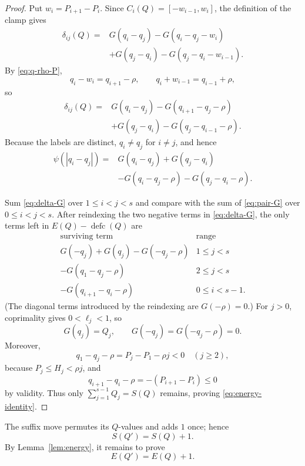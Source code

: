 \documentclass[10pt]{article}
\newcommand{\defc}{\operatorname{defc}}
\begin{document}
\begin{proof}
Put \(w_i=P_{i+1}-P_i\).  Since
\(C_i(Q)=[-w_{i-1},w_i]\), the definition of the clamp gives
\[
\begin{aligned}
\delta_{ij}(Q)
={}&G(q_i-q_j)-G(q_i-q_j-w_i)\\
 &+G(q_j-q_i)-G(q_j-q_i-w_{i-1}).
\end{aligned}
\]
By \eqref{eq:q-rho-P},
\[
  q_i-w_i=q_{i+1}-\rho,
  \qquad
  q_i+w_{i-1}=q_{i-1}+\rho,
\]
so
\begin{equation}
\begin{aligned}
\delta_{ij}(Q)
={}&G(q_i-q_j)-G(q_{i+1}-q_j-\rho)\\
 &+G(q_j-q_i)-G(q_j-q_{i-1}-\rho).
\end{aligned}
\label{eq:delta-G}
\end{equation}
Because the labels are distinct, \(q_i\ne q_j\) for \(i\ne j\), and hence
\begin{equation}
\begin{aligned}
\psi(|q_i-q_j|)
={}&G(q_i-q_j)+G(q_j-q_i)\\
 &-G(q_i-q_j-\rho)-G(q_j-q_i-\rho).
\end{aligned}
\label{eq:pair-G}
\end{equation}

Sum \eqref{eq:delta-G} over \(1\le i<j<s\) and compare with the sum of
\eqref{eq:pair-G} over \(0\le i<j<s\).  After reindexing the two negative
terms in \eqref{eq:delta-G}, the only terms left in \(E(Q)-\defc(Q)\) are
\[
\begin{array}{c|c}
\text{surviving term}&\text{range}\\ \hline
G(-q_j)+G(q_j)-G(-q_j-\rho)&1\le j<s\\
-G(q_1-q_j-\rho)&2\le j<s\\
-G(q_{i+1}-q_i-\rho)&0\le i<s-1.
\end{array}
\]
(The diagonal terms introduced by the reindexing are \(G(-\rho)=0\).)
For \(j>0\), coprimality gives \(0<\ell_j<1\), so
\[
  G(q_j)=Q_j,
  \qquad
  G(-q_j)=G(-q_j-\rho)=0.
\]
Moreover,
\[
  q_1-q_j-\rho=P_j-P_1-\rho j<0\quad(j\ge2),
\]
because \(P_j\le H_j<\rho j\), and
\[
  q_{i+1}-q_i-\rho=-(P_{i+1}-P_i)\le0
\]
by validity.  Thus only \(\sum_{j=1}^{s-1}Q_j=S(Q)\) remains, proving
\eqref{eq:energy-identity}.
\end{proof}

The suffix move permutes its \(Q\)-values and adds \(1\) once; hence
\begin{equation}
  S(Q')=S(Q)+1.
  \label{eq:S-increase}
\end{equation}
By Lemma~\ref{lem:energy}, it remains to prove
\[
  E(Q')=E(Q)+1.
\]
\end{document}
